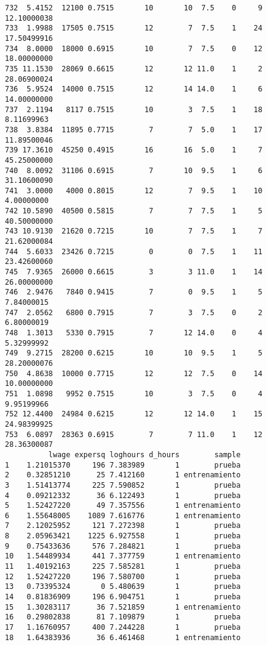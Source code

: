 \documentclass[
  letterpaper,
  DIV=11,
  numbers=noendperiod]{scrreprt}
\begin{document}
\begin{verbatim}
732  5.4152  12100 0.7515       10       10  7.5    0     9 12.10000038
733  1.9988  17505 0.7515       12        7  7.5    1    24 17.50499916
734  8.0000  18000 0.6915       10        7  7.5    0    12 18.00000000
735 11.1530  28069 0.6615       12       12 11.0    1     2 28.06900024
736  5.9524  14000 0.7515       12       14 14.0    1     6 14.00000000
737  2.1194   8117 0.7515       10        3  7.5    1    18  8.11699963
738  3.8384  11895 0.7715        7        7  5.0    1    17 11.89500046
739 17.3610  45250 0.4915       16       16  5.0    1     7 45.25000000
740  8.0092  31106 0.6915        7       10  9.5    1     6 31.10600090
741  3.0000   4000 0.8015       12        7  9.5    1    10  4.00000000
742 10.5890  40500 0.5815        7        7  7.5    1     5 40.50000000
743 10.9130  21620 0.7215       10        7  7.5    1     7 21.62000084
744  5.6033  23426 0.7215        0        0  7.5    1    11 23.42600060
745  7.9365  26000 0.6615        3        3 11.0    1    14 26.00000000
746  2.9476   7840 0.9415        7        0  9.5    1     5  7.84000015
747  2.0562   6800 0.7915        7        3  7.5    0     2  6.80000019
748  1.3013   5330 0.7915        7       12 14.0    0     4  5.32999992
749  9.2715  28200 0.6215       10       10  9.5    1     5 28.20000076
750  4.8638  10000 0.7715       12       12  7.5    0    14 10.00000000
751  1.0898   9952 0.7515       10        3  7.5    0     4  9.95199966
752 12.4400  24984 0.6215       12       12 14.0    1    15 24.98399925
753  6.0897  28363 0.6915        7        7 11.0    1    12 28.36300087
          lwage expersq loghours d_hours        sample
1    1.21015370     196 7.383989       1        prueba
2    0.32851210      25 7.412160       1 entrenamiento
3    1.51413774     225 7.590852       1        prueba
4    0.09212332      36 6.122493       1        prueba
5    1.52427220      49 7.357556       1 entrenamiento
6    1.55648005    1089 7.616776       1 entrenamiento
7    2.12025952     121 7.272398       1        prueba
8    2.05963421    1225 6.927558       1        prueba
9    0.75433636     576 7.284821       1        prueba
10   1.54489934     441 7.377759       1 entrenamiento
11   1.40192163     225 7.585281       1        prueba
12   1.52427220     196 7.580700       1        prueba
13   0.73395324       0 5.480639       1        prueba
14   0.81836909     196 6.904751       1        prueba
15   1.30283117      36 7.521859       1 entrenamiento
16   0.29802838      81 7.109879       1        prueba
17   1.16760957     400 7.244228       1        prueba
18   1.64383936      36 6.461468       1 entrenamiento

\end{verbatim}
\end{document}
